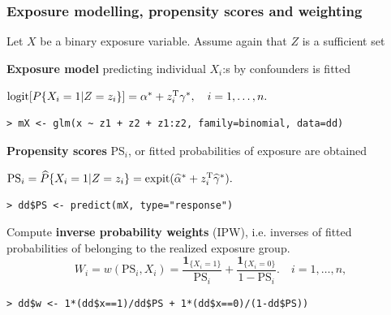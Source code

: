 \documentclass[12pt,dvipsnames,t,aspectratio=169, handout%
]{beamer}
\begin{document}
\begin{frame}[fragile]
\frametitle{\large Exposure modelling, propensity scores and weighting}

Let $X$ be a binary exposure variable. Assume again that $Z$ is a sufficient set 
\pause
\bi
\item
{\bf Exposure model} predicting individual $X_i$:s by confounders is fitted
\begin{center}
$
 \text{logit}[P\{X_i=1|Z=z_i\}] = \alpha^* + z_i^{\small\text{T}}\gamma^*, \quad i=1, \dots, n.
$
\end{center} 
\pause
{\small \color{blue}
\begin{verbatim}
> mX <- glm(x ~ z1 + z2 + z1:z2, family=binomial, data=dd)
\end{verbatim}
}
\pause
\medskip
\item
{\bf Propensity scores} PS$_i$, or fitted  
probabilities of exposure are obtained
\begin{center}
$ \text{PS}_i = \widehat{P}\{X_i=1|Z=z_i\} = \text{expit}(\widehat\alpha^* + z_i^{\small\text{T}}\widehat\gamma^* ). $
\end{center}
\pause
{\small \color{blue}
\begin{verbatim}
> dd$PS <- predict(mX, type="response")
\end{verbatim}
} 
\pause
\medskip
\item
Compute {\bf inverse probability weights} (IPW), 
i.e.  inverses of fitted probabilities of belonging to the realized exposure group. 
$$ W_i = w(\text{PS}_i, X_i) = \frac{ {\mathbf 1}_{ \{X_i=1\} } }{\text{PS}_i} +
                    \frac{ {\mathbf 1}_{ \{X_i=0\} } }{1 - \text{PS}_i}.
  \quad i=1, \dots, n ,
$$
{\small \color{blue}
\begin{verbatim}
> dd$w <- 1*(dd$x==1)/dd$PS + 1*(dd$x==0)/(1-dd$PS))
\end{verbatim}
}
\ei
\end{frame}
\end{document}
